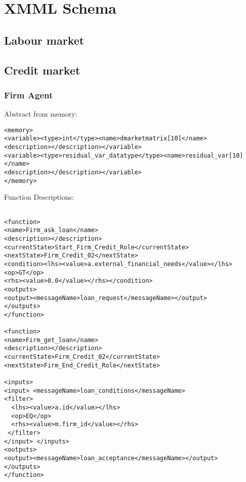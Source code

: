 \chapter{XMML Schema}\label{appendix}

\section{Labour market}
\section{Credit market}

\subsection{Firm Agent}
Abstract from memory:
\begin{mylisting}
\begin{verbatim}
<memory>
<variable><type>int</type><name>dmarketmatrix[10]</name>
<description></description></variable>
<variable><type>residual_var_datatype</type><name>residual_var[10]</name>
<description></description></variable>
</memory>
\end{verbatim}
\end{mylisting}

Function Descriptions:
\begin{mylisting}
\begin{verbatim}

<function> 
<name>Firm_ask_loan</name>
<description></description>
<currentState>Start_Firm_Credit_Role</currentState>
<nextState>Firm_Credit_02</nextState>
<condition><lhs><value>a.external_financial_needs</value></lhs><op>GT</op>
<rhs><value>0.0</value></rhs></condition>
<outputs> 
<output><messageName>loan_request</messageName></output>
</outputs> 
</function>

<function> 
<name>Firm_get_loan</name> 
<description></description>
<currentState>Firm_Credit_02</currentState>
<nextState>Firm_End_Credit_Role</nextState>

<inputs> 
<input> <messageName>loan_conditions</messageName> 
<filter>
  <lhs><value>a.id</value></lhs>
  <op>EQ</op>
  <rhs><value>m.firm_id</value></rhs>
 </filter>
</input> </inputs> 
<outputs>
<output><messageName>loan_acceptance</messageName></output>
</outputs> 
</function>

\end{verbatim}
\end{mylisting}

